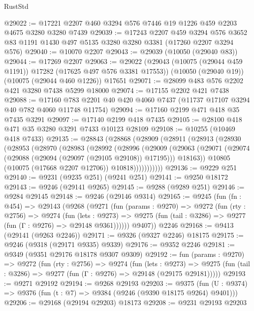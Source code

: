 \begin{lexlean}{RustStd}
\begin{coremodule}
@29022 := @17221 @2207 @460 @3294 @576 @7446 @19 @1226 @459 @2203 @4675 @3280 @3280 @7439
@29039 := @17243
    @2207
    @459
    @3294
    @576
    @3652
    @83
    @1191
    @1430
    @497
    @5135
    @3280
    @3280
    @3381
    (@17260 @2207 @3294 @576)
@29040 := @10070 @2207
@29043 := @29039 (@10050 (@29040 @83))
@29044 := @17269 @2207
@29063 := @29022
    (@29043 (@10075 (@29044 @459 @1191)) @17282 (@17625 @497 @576 @3381 @17553))
    (@10050 (@29040 @19))
    (@10075 (@29044 @460 @1226))
    @17651
@29071 := @28099 @483 @576 @2202 @421 @3280 @7438 @5299 @18000
@29074 := @17155 @2202 @421 @7438
@29088 := @17160 @783 @2201 @40 @420 @4060 @7437 (@11737 @17107 @3294 @40 @782 @4060 @11748 @11754)
@29094 := @17160 @2199 @471 @418 @35 @7435 @3291
@29097 := @17140 @2199 @418 @7435
@29105 := @28100 @418 @471 @35 @3280 @3291 @7433 @10123 @28109
@29108 := @10255 (@10469 @418 @7433)
@29135 := @28843
    (@28868
      (@28909
        (@28911
          (@28913
            (@28930
              (@28953
                (@28970
                  (@28983
                    (@28992
                      (@28996
                        (@29009
                          (@29063
                            (@29071
                              (@29074 (@29088 (@29094 (@29097 (@29105 @29108)) @17195)))
                              @18163))
                          @10805
                          (@10075 (@17668 @2207 @12706))
                          @10818)))))))))))
@29136 := @9229 @251
@29140 := @9231 (@9235 @251) (@9241 @251)
@29141 := @9250 @18172
@29143 := @9246 (@29141 @9265)
@29145 := @9288 (@9289 @251)
@29146 := @9284 @29145
@29148 := @9246 (@29146 @9314)
@29165 := @9245
    (fun (fn : @454) =>
    @29143
      (@9268
        (@9271
          (fun (params : @9270) =>
          @9272
            (fun (rty : @2756) =>
            @9274
              (fun (lets : @9273) =>
              @9275 (fun (tail : @3286) => @9277 (fun (Γ : @9276) => @29148 @9361))))))
        @9407))
    @2246
@29168 := @9413 (@29141 (@9263 @2246))
@29171 := @9326 (@9327 @2246) @18175
@29175 := @9246 (@9318 (@29171 @9335) @9339)
@29176 := @9352 @2246
@29181 := @9349 (@9351 @29176 @18178 @9307 @9309)
@29192 := fun (params : @9270) =>
  @9272
    (fun (rty : @2756) =>
    @9274
      (fun (lets : @9273) =>
      @9275 (fun (tail : @3286) => @9277 (fun (Γ : @9276) => @29148 (@29175 @29181)))))
@29193 := @9271 @29192
@29194 := @9268 @29193
@29203 := @9375
    (fun (U : @9374) => @9376 (fun (t : @7) => @9384 (@9246 (@9390 @18175 @9264) @9401)))
@29206 := @29168 (@29194 @29203) @18173
@29208 := @9231 @29193 @29203

\end{coremodule}
\end{lexlean}
